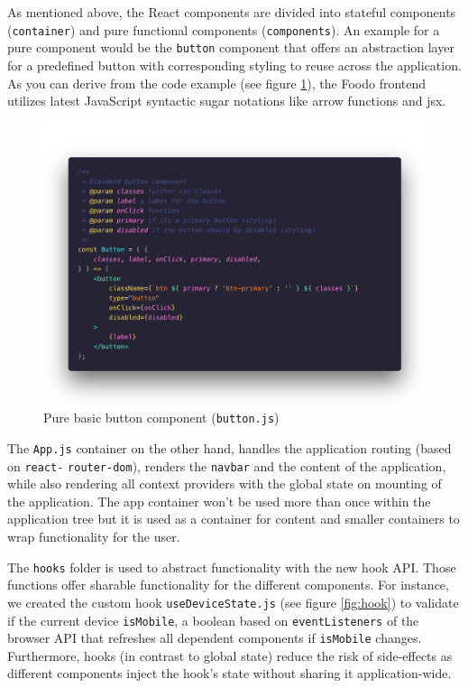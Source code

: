 As mentioned above, the React components are divided into stateful components (\texttt{container}) and pure functional components (\texttt{components}). An example for a pure component would be the \texttt{button} component that offers an abstraction layer for a predefined button with corresponding styling to reuse across the application. As you can derive from the code example (see figure \ref{fig:button}), the Foodo frontend utilizes latest JavaScript syntactic sugar notations like arrow functions and \gls{jsx}.

\vspace{-2em}
\begin{figure}[!ht]
	\captionsetup{justification=centering}
	\centering
		\includegraphics[scale=0.28]{Ressourcen/img/code/button.png}
		\vspace{-3em}
		\caption{Pure basic button component (\texttt{button.js})}
		\label{fig:button}
\end{figure}

The \texttt{App.js} container on the other hand, handles the application routing (based on \texttt{react-} \texttt{router-dom}), renders the \texttt{navbar} and the content of the application, while also rendering all context providers with the global state on mounting of the application. The app container won’t be used more than once within the application tree but it is used as a container for content and smaller containers to wrap functionality for the user. 

The \texttt{hooks} folder is used to abstract functionality with the new hook API. Those functions offer sharable functionality for the different components. For instance, we created the custom hook \texttt{useDeviceState.js} (see figure \ref{fig:hook})  to validate if the current device \texttt{isMobile}, a boolean based on \texttt{eventListeners} of the browser API that refreshes all dependent components if \texttt{isMobile} changes. Furthermore, hooks (in contrast to global state) reduce the risk of side-effects as different components inject the hook's state without sharing it application-wide. 

